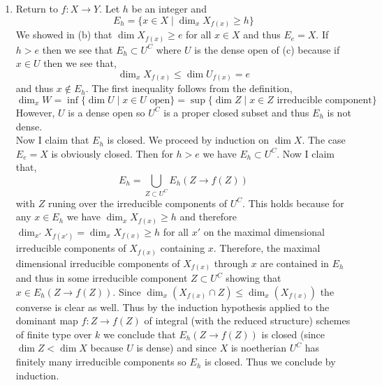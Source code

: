 \documentclass[12pt]{article}
\begin{document}
\begin{enumerate}
\item Return to $f : X \to Y$. Let $h$ be an integer and
\[ E_h = \{ x \in X \mid \dim_x{X_{f(x)}} \ge h \} \] 
We showed in (b) that $\dim{X_{f(x)}} \ge e$ for all $x \in X$ and thus $E_e = X$. If $h > e$ then we see that $E_h \subset U^C$ where $U$ is the dense open of (c) because if $x \in U$ then we see that,
\[ \dim_x{X_{f(x)}} \le \dim{U_{f(x)}} = e \]
and thus $x \notin E_h$. The first inequality follows from the definition,
\[ \dim_x{W} = \inf \{ \dim{U} \mid x \in U \text{ open} \} = \sup \{ \dim{Z} \mid x \in Z \text{ irreducible component} \} \]
However, $U$ is a dense open so $U^C$ is a proper closed subset and thus $E_h$ is not dense.
\bigskip\\
Now I claim that $E_h$ is closed. We proceed by induction on $\dim{X}$. The case $E_e = X$ is obviously closed. Then for $h > e$ we have $E_h \subset U^C$. Now I claim that,
\[ E_h = \bigcup_{Z \subset U^C} E_h(Z \to f(Z)) \]
with $Z$ runing over the irreducible components of $U^C$. This holds because for any $x \in E_h$ we have $\dim_x{X_{f(x)}} \ge h$ and therefore $\dim_{x'}{X_{f(x')}} = \dim_x{X_{f(x)}} \ge h$ for all $x'$ on the maximal dimensional irreducible components of $X_{f(x)}$ containing $x$. Therefore, the maximal dimensional irreducible components of $X_{f(x)}$ through $x$ are contained in $E_h$ and thus in some irreducible component $Z \subset U^C$ showing that $x \in E_h(Z \to f(Z))$. Since $\dim_x{(X_{f(x)} \cap Z)} \le \dim_x{(X_{f(x)})}$ the converse is clear as well. Thus by the induction hypothesis applied to the dominant map $f : Z \to f(Z)$ of integral (with the reduced structure) schemes of finite type over $k$ we conclude that $E_h(Z \to f(Z))$ is closed (since $\dim{Z} < \dim{X}$ because $U$ is dense) and since $X$ is noetherian $U^C$ has finitely many irreducible components so $E_h$ is closed. Thus we conclude by induction.


\end{enumerate}
\end{document}
